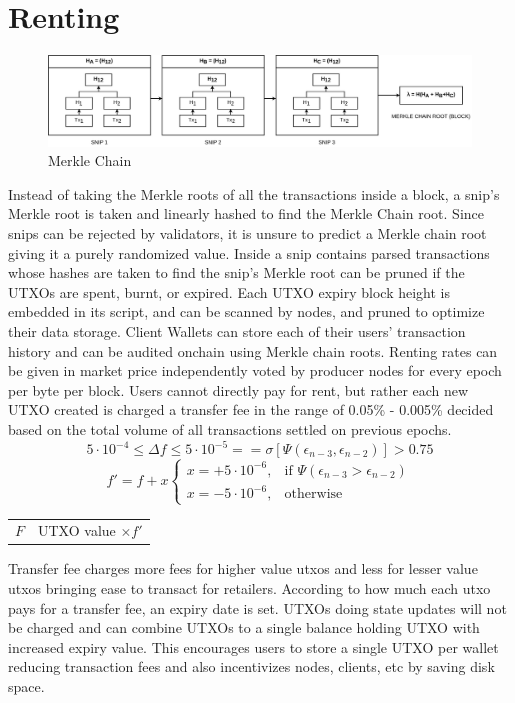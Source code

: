 \documentclass[a4paper,10pt]{article}
\makeatletter
\newenvironment{conditions}
  {\par\vspace{\abovedisplayskip}\noindent\begin{tabular}{>{$}l<{$} @{${}={}$} l}}
  {\end{tabular}\par\vspace{\belowdisplayskip}}
\makeatother
\begin{document}
\section{Renting}
\begin{figure}[h]
\begin{center}
\includegraphics[width=13cm]{merklechain}
\caption{Merkle Chain}
\end{center}
\end{figure}
Instead of taking the Merkle roots of all the transactions inside a block, a snip's Merkle root is taken and linearly hashed to find the Merkle Chain root. Since snips can be rejected by validators, it is unsure to predict a Merkle chain root giving it a purely randomized value. Inside a snip contains parsed transactions whose hashes are taken to find the snip's Merkle root can be pruned if the UTXOs are spent, burnt, or expired. Each UTXO expiry block height is embedded in its script, and can be scanned by nodes, and pruned to optimize their data storage. Client Wallets can store each of their users' transaction history and can be audited onchain using Merkle chain roots. Renting rates can be given in market price independently voted by producer nodes for every epoch per byte per block. Users cannot directly pay for rent, but rather each new UTXO created is charged a transfer fee in the range of 0.05\% - 0.005\% decided based on the total volume of all transactions settled on previous epochs.
\begin{equation*}
5 \cdot 10^{-4} \leq \Delta f \leq 5 \cdot 10^{-5} == \sigma [\Psi (\epsilon_{n-3}, \epsilon_{n-2})] > 0.75
\end{equation*}
\begin{equation*}
f'=f+x \begin{cases}
x=+5 \cdot 10^{-6}, & \text{if } \Psi (\epsilon_{n-3} > \epsilon_{n-2})\\
x=-5 \cdot 10^{-6}, & \text{otherwise}
\end{cases}
\end{equation*}
\begin{conditions}
F & UTXO value $\times f'$ 
\end{conditions}
 Transfer fee charges more fees for higher value utxos and less for lesser value utxos bringing ease to transact for retailers. According to how much each utxo pays for a transfer fee, an expiry date is set. UTXOs doing state updates will not be charged and can combine UTXOs to a single balance holding UTXO with increased expiry value. This encourages users to store a single UTXO per wallet reducing transaction fees and also incentivizes nodes, clients, etc by saving disk space.  
\end{document}
